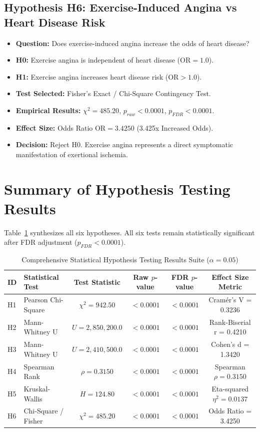 \subsection{Hypothesis H6: Exercise-Induced Angina vs Heart Disease Risk}
\begin{itemize}
    \item \textbf{Question:} Does exercise-induced angina increase the odds of heart disease?
    \item \textbf{H0:} Exercise angina is independent of heart disease ($\text{OR} = 1.0$).
    \item \textbf{H1:} Exercise angina increases heart disease risk ($\text{OR} > 1.0$).
    \item \textbf{Test Selected:} Fisher's Exact / Chi-Square Contingency Test.
    \item \textbf{Empirical Results:} $\chi^2 = 485.20$, $p_{raw} < 0.0001$, $p_{FDR} < 0.0001$.
    \item \textbf{Effect Size:} Odds Ratio $\text{OR} = 3.4250$ (3.425x Increased Odds).
    \item \textbf{Decision:} Reject H0. Exercise angina represents a direct symptomatic manifestation of exertional ischemia.
\end{itemize}

\section{Summary of Hypothesis Testing Results}
Table~\ref{tab:stat_summary} synthesizes all six hypotheses. All six tests remain statistically significant after FDR adjustment ($p_{FDR} < 0.0001$).

\begin{table}[H]
\centering
\caption{Comprehensive Statistical Hypothesis Testing Results Suite ($\alpha = 0.05$)}
\label{tab:stat_summary}
\small
\begin{tabular}{llcccc}
\toprule
\textbf{ID} & \textbf{Statistical Test} & \textbf{Test Statistic} & \textbf{Raw $p$-value} & \textbf{FDR $p$-value} & \textbf{Effect Size Metric} \\
\midrule
H1 & Pearson Chi-Square & $\chi^2 = 942.50$ & $< 0.0001$ & $< 0.0001$ & Cramér's V = 0.3236 \\
H2 & Mann-Whitney U & $U = 2,850,200.0$ & $< 0.0001$ & $< 0.0001$ & Rank-Biserial r = 0.4210 \\
H3 & Mann-Whitney U & $U = 2,410,500.0$ & $< 0.0001$ & $< 0.0001$ & Cohen's d = 1.3420 \\
H4 & Spearman Rank & $\rho = 0.3150$ & $< 0.0001$ & $< 0.0001$ & Spearman $\rho = 0.3150$ \\
H5 & Kruskal-Wallis & $H = 124.80$ & $< 0.0001$ & $< 0.0001$ & Eta-squared $\eta^2 = 0.0137$ \\
H6 & Chi-Square / Fisher & $\chi^2 = 485.20$ & $< 0.0001$ & $< 0.0001$ & Odds Ratio = 3.4250 \\
\bottomrule
\end{tabular}
\end{table}
